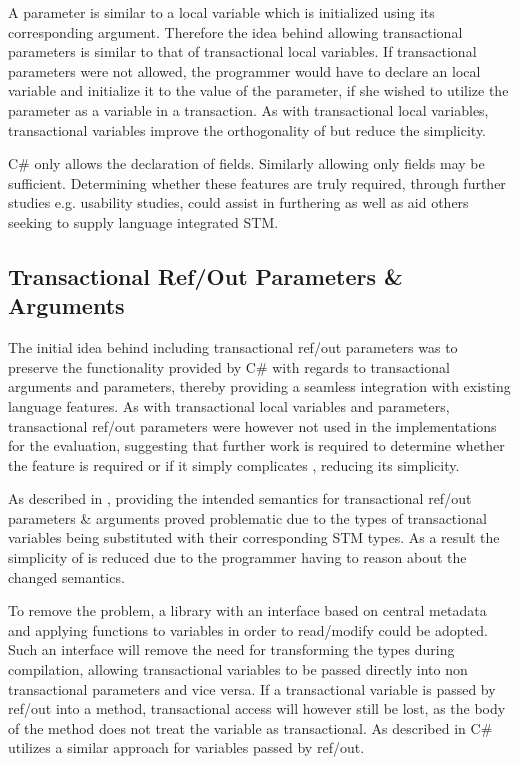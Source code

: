 A parameter is similar to a local variable which is initialized using its corresponding argument\cite[p. 76]{sestoft2011c}. Therefore the idea behind allowing transactional parameters is similar to that of transactional local variables. If transactional parameters were not allowed, the programmer would have to declare an  local variable and initialize it to the value of the parameter, if she wished to utilize the parameter as a variable in a transaction. As with transactional local variables, transactional variables improve the orthogonality of \stmname but reduce the simplicity.

C\# only allows the declaration of  fields. Similarly allowing only  fields may be sufficient. Determining whether these features are truly required, through further studies e.g. usability studies, could assist in furthering \stmname as well as aid others seeking to supply language integrated \ac{STM}. 


\subsection{Transactional Ref/Out Parameters \& Arguments}\label{subse:reflection_ref_out}
The initial idea behind including transactional ref/out parameters was to preserve the functionality provided by C\# with regards to transactional arguments and parameters, thereby providing a seamless integration with existing language features. As with transactional local variables and parameters, transactional ref/out parameters were however not used in the implementations for the evaluation, suggesting that further work is required to determine whether the feature is required or if it simply complicates \stmname, reducing its simplicity. 

As described in , providing the intended semantics for transactional ref/out parameters \& arguments proved problematic due to the types of transactional variables being substituted with their corresponding \ac{STM} types. As a result the simplicity of \stmname is reduced due to the programmer having to reason about the changed semantics.

To remove the problem, a library with an interface based on central metadata and applying functions to variables in order to read/modify could be adopted. Such an interface will remove the need for transforming the types during compilation, allowing transactional variables to be passed directly into non transactional parameters and vice versa. If a transactional variable is passed by ref/out into a method, transactional access will however still be lost, as the body of the method does not treat the variable as transactional. As described in  C\# utilizes a similar approach for  variables passed by ref/out.

